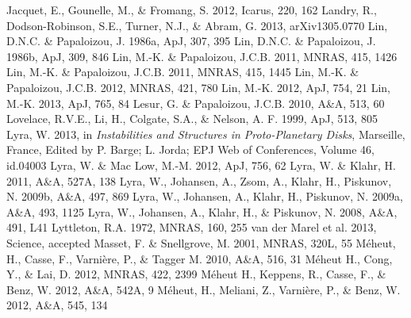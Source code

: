 \documentclass[apj]{emulateapj}
\begin{document}
\begin{thebibliography}{}
 Jacquet, E., Gounelle, M., \& Fromang, S. 2012, Icarus, 220, 162
 Landry, R., Dodson-Robinson, S.E., Turner, N.J., \& Abram, G. 2013, arXiv1305.0770
 Lin, D.N.C. \& Papaloizou, J. 1986a, ApJ, 307, 395
 Lin, D.N.C. \& Papaloizou, J. 1986b, ApJ, 309, 846
 Lin, M.-K. \& Papaloizou, J.C.B. 2011, MNRAS, 415, 1426
 Lin, M.-K. \& Papaloizou, J.C.B. 2011, MNRAS, 415, 1445
 Lin, M.-K. \& Papaloizou, J.C.B. 2012, MNRAS, 421, 780
 Lin, M.-K. 2012, ApJ, 754, 21
 Lin, M.-K. 2013, ApJ, 765, 84
 Lesur, G. \& Papaloizou, J.C.B. 2010, A\&A, 513, 60
 Lovelace, R.V.E., Li, H., Colgate, S.A., \& Nelson, A. F. 1999, ApJ, 513, 805
 Lyra, W. 2013, in {\it Instabilities and Structures in Proto-Planetary Disks}, Marseille, France, Edited by P. Barge; L. Jorda; EPJ Web of Conferences, Volume 46, id.04003 
 Lyra, W. \& Mac Low, M.-M. 2012, ApJ, 756, 62
 Lyra, W. \& Klahr,  H. 2011, A\&A, 527A, 138
 Lyra, W., Johansen, A., Zsom, A., Klahr, H., Piskunov, N. 2009b, A\&A, 497, 869
 Lyra, W., Johansen, A., Klahr, H., Piskunov, N. 2009a, A\&A, 493, 1125 
 Lyra, W., Johansen, A., Klahr, H., \& Piskunov, N. 2008, A\&A, 491, L41
 Lyttleton, R.A. 1972, MNRAS, 160, 255
 van der Marel et al. 2013, Science, accepted
 Masset, F. \& Snellgrove, M. 2001, MNRAS, 320L, 55
 M\'eheut, H., Casse, F., Varni\`ere, P., \& Tagger M. 2010, A\&A, 516, 31
 M\'eheut H., Cong, Y., \& Lai, D. 2012, MNRAS, 422, 2399
 M\'eheut H., Keppens,  R., Casse, F., \& Benz, W. 2012, A\&A, 542A, 9
 M\'eheut, H., Meliani, Z., Varni\`ere, P., \& Benz, W. 2012, A\&A, 545, 134

\end{thebibliography}
\end{document}
